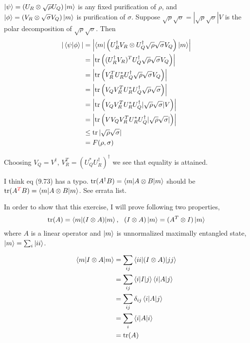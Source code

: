 $\ket{\psi} = (U_R \otimes \sqrt{\rho}U_Q) \ket{m}$ is any fixed purification of $\rho$, and $\ket{\phi} = (V_R \otimes \sqrt{\sigma}V_Q) \ket{m}$ is purification of $\sigma$.
Suppose $\sqrt{\rho} \sqrt{\sigma} = |\sqrt{\rho} \sqrt{\sigma}| V$ is the polar decomposition of $\sqrt{\rho} \sqrt{\sigma}$. Then
%
\begin{align*}
    |\braket{\psi | \phi}| &= \left|\braket{m | \left( U_R^\dagger V_R \otimes U_Q^\dagger \sqrt{\rho} \sqrt{\sigma} V_Q \right) | m } \right|\\
        &= \left| \operatorname{tr} \left((U_R^\dagger V_R)^T U_Q^\dagger \sqrt{\rho} \sqrt{\sigma} V_Q \right)\right|\\
        &= \left| \operatorname{tr} \left( V_R^T U_R^* U_Q^\dagger \sqrt{\rho} \sqrt{\sigma} V_Q \right)\right|\\
        &= \left| \operatorname{tr} \left( V_Q V_R^T U_R^* U_Q^\dagger \sqrt{\rho} \sqrt{\sigma} \right)\right|\\
        &= \left| \operatorname{tr} \left( V_Q V_R^T U_R^* U_Q^\dagger |\sqrt{\rho} \sqrt{\sigma}| V \right)\right|\\
        &= \left| \operatorname{tr} \left( V V_Q V_R^T U_R^* U_Q^\dagger |\sqrt{\rho} \sqrt{\sigma}| \right)\right|\\
        &\leq \operatorname{tr} | \sqrt{\rho} \sqrt{\sigma}|\\
        &= F(\rho, \sigma)
\end{align*}

Choosing $V_Q = V^\dagger$, $V_R^T = (U_Q^* U_R^\dagger)^\dagger$ we see that equality is attained.


I think eq (9.73) has a typo. $\operatorname{tr} (A^\dagger B) = \braket{m | A \otimes B | m}$ should be $\operatorname{tr} (A^{\textcolor{red}{T}} B) = \braket{m | A \otimes B | m}$. See errata list.

In order to show that this exercise, I will prove following two properties,
\begin{align*}
    \operatorname{tr}(A) = \braket{m | (I \otimes A) | m}, ~~ (I \otimes A)\ket{ m} = (A^T \otimes I)\ket{m}
\end{align*}
where $A$ is a linear operator and $\ket{m}$ is unnormalized maximally entangled state, $\ket{m} = \sum_i \ket{ii}$.

\begin{align*}
    \braket{m |I \otimes A| m} &= \sum_{ij} \braket{ii | (I \otimes A) | jj}\\
        &= \sum_{ij} \braket{i | I | j} \braket{i | A | j}\\
        &= \sum_{ij} \delta_{ij} \braket{i | A | j}\\
        &= \sum_i \braket{i | A | i}\\
        &= \operatorname{tr} (A)
\end{align*}

